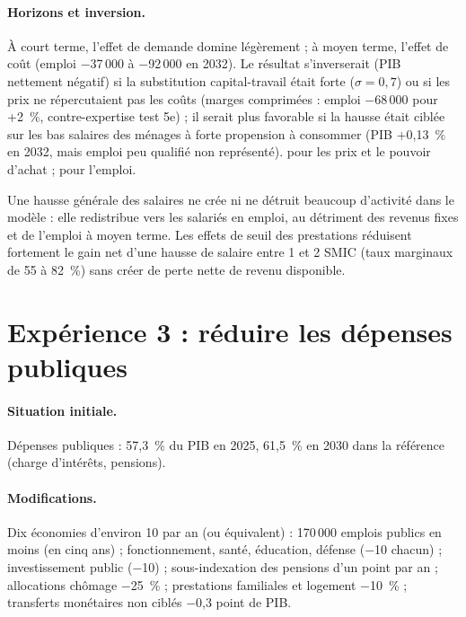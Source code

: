 \paragraph{Horizons et inversion.} À court terme, l'effet de demande domine légèrement ; à moyen terme, l'effet de coût
(emploi $-$37\,000 à $-$92\,000 en 2032). Le résultat s'inverserait (PIB nettement négatif) si la substitution
capital-travail était forte ($\sigma = 0{,}7$) ou si les prix ne répercutaient pas les coûts (marges comprimées : emploi
$-$68\,000 pour +2~\%, contre-expertise test 5e) ; il serait plus favorable si la hausse était ciblée sur les bas
salaires des ménages à forte propension à consommer (PIB +0,13~\% en 2032, mais emploi peu qualifié non représenté).
 pour les prix et le pouvoir d'achat ;  pour l'emploi.

\begin{resultat}
Une hausse générale des salaires ne crée ni ne détruit beaucoup d'activité dans le modèle : elle redistribue vers les
salariés en emploi, au détriment des revenus fixes et de l'emploi à moyen terme. Les effets de seuil des prestations
réduisent fortement le gain net d'une hausse de salaire entre 1 et 2 SMIC (taux marginaux de 55 à 82~\%) sans créer de
perte nette de revenu disponible.
\end{resultat}

\section{Expérience 3 : réduire les dépenses publiques}
\label{sec:exp3}

\paragraph{Situation initiale.} Dépenses publiques : 57,3~\% du PIB en 2025, 61,5~\% en 2030 dans la référence (charge
d'intérêts, pensions).

\paragraph{Modifications.} Dix économies d'environ 10\md{} par an (ou équivalent) : 170\,000 emplois publics en moins
(en cinq ans) ; fonctionnement, santé, éducation, défense ($-$10\md{} chacun) ; investissement public ($-$10\md) ;
sous-indexation des pensions d'un point par an ; allocations chômage $-$25~\% ; prestations familiales et logement
$-$10~\% ; transferts monétaires non ciblés $-$0,3 point de PIB.

